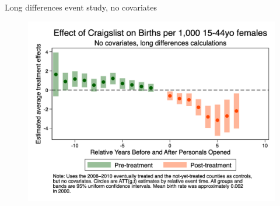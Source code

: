 \documentclass{beamer}
\begin{document}
\begin{frame}{Long differences event study, no covariates}

\begin{figure}
    \centering
    \includegraphics[height=0.85\textheight]{./lecture_includes/es_births_none}
\end{figure}

\end{frame}
\end{document}
